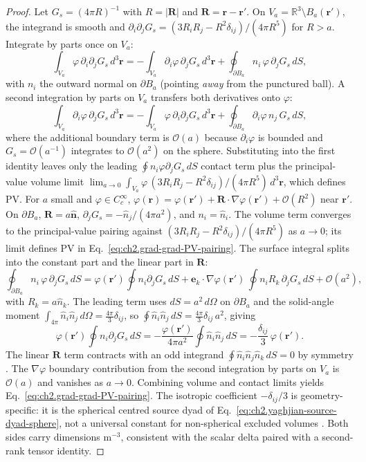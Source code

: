\begin{proof}
Let $G_s=(4\pi R)^{-1}$ with $R=|\mathbf{R}|$ and $\mathbf{R}=\mathbf{r}-\mathbf{r}'$.
On $V_a=\mathbb{R}^{3}\setminus B_a(\mathbf{r}')$, the integrand is smooth and
$\partial_i\partial_j G_s=(3R_iR_j-R^2\delta_{ij})/(4\pi R^5)$ for $R>a$.
Integrate by parts once on $V_a$:
\[
\int_{V_a}\varphi\,\partial_i\partial_j G_s\,d^{3}\mathbf{r}
=
-\int_{V_a}\partial_i\varphi\,\partial_j G_s\,d^{3}\mathbf{r}
+\oint_{\partial B_a}n_i\,\varphi\,\partial_j G_s\,dS,
\]
with $n_i$ the outward normal on $\partial B_a$ (pointing \emph{away} from the punctured ball).
A second integration by parts on $V_a$ transfers both derivatives onto $\varphi$:
\[
\int_{V_a}\partial_i\varphi\,\partial_j G_s\,d^{3}\mathbf{r}
=
-\int_{V_a}\varphi\,\partial_i\partial_j G_s\,d^{3}\mathbf{r}
+\oint_{\partial B_a}\partial_i\varphi\,n_j\,G_s\,dS,
\]
where the additional boundary term is $\mathcal{O}(a)$ because $\partial_i\varphi$ is bounded and $G_s=\mathcal{O}(a^{-1})$ integrates to $\mathcal{O}(a^{2})$ on the sphere.
Substituting into the first identity leaves only the leading $\oint n_i\varphi\partial_j G_s\,dS$ contact term plus the principal-value volume limit
$\lim_{a\to 0}\int_{V_a}\varphi\,(3R_iR_j-R^2\delta_{ij})/(4\pi R^5)\,d^{3}\mathbf{r}$, which defines $\mathrm{PV}$.
For $a$ small and $\varphi\in C_c^{\infty}$, $\varphi(\mathbf{r})=\varphi(\mathbf{r}')+\mathbf{R}\cdot\nabla\varphi(\mathbf{r}')+\mathcal{O}(R^{2})$ near $\mathbf{r}'$.
On $\partial B_a$, $\mathbf{R}=a\hat{\mathbf{n}}$, $\partial_j G_s=-\hat{n}_j/(4\pi a^2)$, and $n_i=\hat{n}_i$.
The volume term converges to the principal-value pairing against $(3R_iR_j-R^2\delta_{ij})/(4\pi R^5)$ as $a\to 0$; its limit defines $\mathrm{PV}$ in Eq.~\eqref{eq:ch2.grad-grad-PV-pairing}.
The surface integral splits into the constant part and the linear part in $\mathbf{R}$:
\[
\oint_{\partial B_a}n_i\,\varphi\,\partial_j G_s\,dS
=
\varphi(\mathbf{r}')\oint n_i\partial_j G_s\,dS
+\mathbf{e}_k\cdot\nabla\varphi(\mathbf{r}')\,\oint n_i R_k\,\partial_j G_s\,dS
+\mathcal{O}(a^{2}),
\]
with $R_k=a\hat{n}_k$.
The leading term uses $dS=a^{2}\,d\Omega$ on $\partial B_a$ and the solid-angle moment
$\int_{4\pi}\hat{n}_i\hat{n}_j\,d\Omega=\frac{4\pi}{3}\delta_{ij}$, so $\oint \hat{n}_i\hat{n}_j\,dS=\frac{4\pi}{3}\delta_{ij}\,a^{2}$, giving
\[
\varphi(\mathbf{r}')\oint n_i\partial_j G_s\,dS
=
-\frac{\varphi(\mathbf{r}')}{4\pi a^2}\oint \hat{n}_i\hat{n}_j\,dS
=
-\frac{\delta_{ij}}{3}\,\varphi(\mathbf{r}').
\]
The linear $\mathbf{R}$ term contracts with an odd integrand $\oint \hat{n}_i\hat{n}_j\hat{n}_k\,dS=0$ by symmetry \cite{jackson1999}.
The $\nabla\varphi$ boundary contribution from the second integration by parts on $V_a$ is
$\mathcal{O}(a)$ and vanishes as $a\to 0$.
Combining volume and contact limits yields Eq.~\eqref{eq:ch2.grad-grad-PV-pairing}.
The isotropic coefficient $-\delta_{ij}/3$ is geometry-specific: it is the spherical centred source dyad of Eq.~\eqref{eq:ch2.yaghjian-source-dyad-sphere}, not a universal constant for non-spherical excluded volumes \cite{yaghjian1978,yaghjian1980source}.
Both sides carry dimensions m$^{-3}$, consistent with the scalar delta paired with a second-rank tensor identity.
\end{proof}
